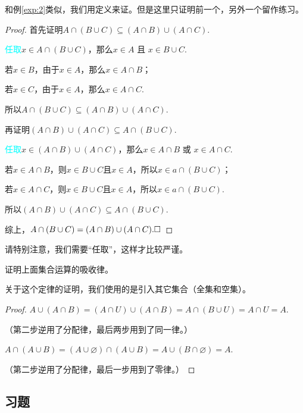 \documentclass[lang=cn,math=cm,chinesefont=nofont,11pt,scheme=chinese,onecol]{elegantbook}
\begin{document}
  和例\ref{exp:2}类似，我们用定义来证。但是这里只证明前一个，另外一个留作练习。

\begin{proof}
  首先证明$A\cap(B\cup C)\subseteq(A\cap B)\cup(A\cap C)$.

  \textcolor{cyan}{任取}\enspace$x\in A\cap(B\cup C)$，那么$x\in A\text{ 且 }x\in B\cup C$.

  若$x\in B$，由于$x\in A$，那么$x\in A\cap B$；

  若$x\in C$，由于$x\in A$，那么$x\in A\cap C$.

  所以$A\cap(B\cup C)\subseteq(A\cap B)\cup(A\cap C)$.

  \hspace*{\fill}

  再证明$(A\cap B)\cup(A\cap C)\subseteq A\cap(B\cup C)$.

  \textcolor{cyan}{任取}\enspace$x\in (A\cap B)\cup(A\cap C)$，那么$x\in A\cap B\text{ 或 }x\in A\cap C$.

  若$x\in A\cap B$，则$x\in B\cup C\text{且}x\in A$，所以$x\in a\cap(B\cup C)$；

  若$x\in A\cap C$，则$x\in B\cup C\text{且}x\in A$，所以$x\in a\cap(B\cup C)$.

  所以$(A\cap B)\cup(A\cap C)\subseteq A\cap(B\cup C)$.

  综上，$A\cap(B\cup C)=(A\cap B)\cup(A\cap C).\hfill\square$
\end{proof}
\begin{remark}
  请特别注意，我们需要“任取”，这样才比较严谨。
\end{remark}

\hspace*{\fill}

\begin{example}
  证明上面集合运算的吸收律。
\end{example}
关于这个定律的证明，我们使用的是引入其它集合（全集和空集）。

\begin{proof}
  $A\cup (A\cap B)=(A\cap U)\cup(A\cap B)=A\cap(B\cup U)=A\cap U=A.$

  （第二步逆用了分配律，最后两步用到了同一律。）

  $A\cap(A\cup B)=(A\cup\varnothing)\cap(A\cup B)=A\cup(B\cap\varnothing)=A.$

  （第二步逆用了分配律，最后一步用到了零律。）
\end{proof}

\subsection{习题}
\end{document}
